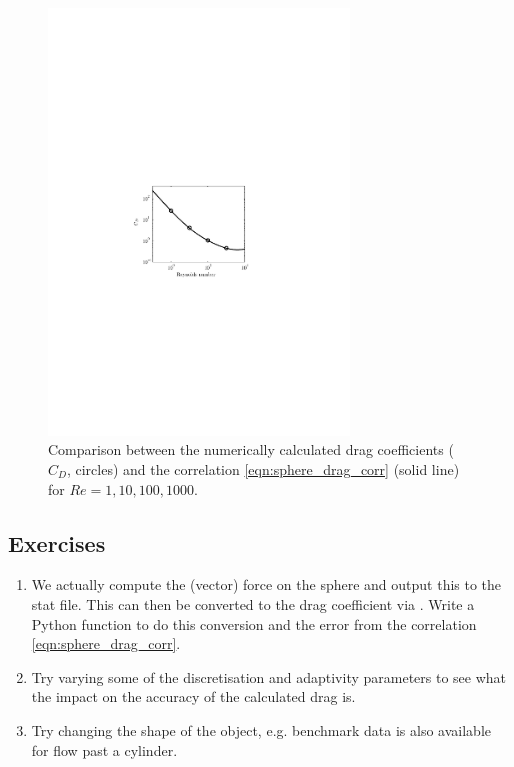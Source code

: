 \begin{figure}
\centering
\includegraphics[width=8cm,clip]{examples_images/flow_past_sphere/Sphere_Drag.pdf}
\caption{Comparison between the numerically calculated drag coefficients ($C_D$, circles) and the correlation \eqref{eqn:sphere_drag_corr} (solid line)
for $Re=1,10,100,1000$.}
\label{fig:flow_past_sphere_3}
\end{figure}



\subsection{Exercises}
\begin{enumerate}
\item We actually compute the (vector) force on the sphere and output this to the stat file. This can then be converted to the drag coefficient 
via \label{eqn:drag_coeff}. Write a Python function to do this conversion and the error from the correlation \eqref{eqn:sphere_drag_corr}.
\item Try varying some of the discretisation and adaptivity parameters to see what the impact on the accuracy of the
calculated drag is.
\item Try changing the shape of the object, e.g. benchmark data is also available for flow past a cylinder.
\end{enumerate}



